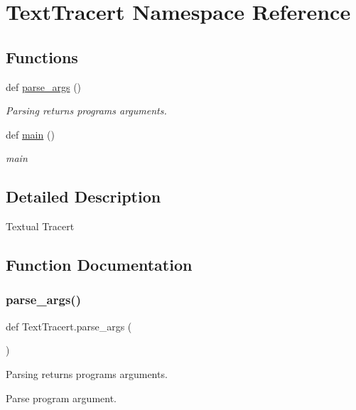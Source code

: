 \hypertarget{namespace_text_tracert}{}\section{Text\+Tracert Namespace Reference}
\label{namespace_text_tracert}
\subsection*{Functions}
\begin{DoxyCompactItemize}
\item 
def \hyperlink{namespace_text_tracert_a788ac14119293041b1d87a34d711ee01}{parse\+\_\+args} ()
\begin{DoxyCompactList}\small\item\em Parsing returns program\textquotesingle{}s arguments. \end{DoxyCompactList}\item 
\mbox{\label{namespace_text_tracert_a1e78ea4b0c5d3048c9ba763d37abe449}} 
def \hyperlink{namespace_text_tracert_a1e78ea4b0c5d3048c9ba763d37abe449}{main} ()
\begin{DoxyCompactList}\small\item\em main \end{DoxyCompactList}\end{DoxyCompactItemize}


\subsection{Detailed Description}
\begin{DoxyVerb}Textual Tracert \end{DoxyVerb}
 

\subsection{Function Documentation}
\mbox{\label{namespace_text_tracert_a788ac14119293041b1d87a34d711ee01}} 
\subsubsection{\texorpdfstring{parse\+\_\+args()}{parse\_args()}}
{\footnotesize\ttfamily def Text\+Tracert.\+parse\+\_\+args (\begin{DoxyParamCaption}{ }\end{DoxyParamCaption})}



Parsing returns program\textquotesingle{}s arguments. 

\begin{DoxyVerb}Parse program argument.\end{DoxyVerb}
 